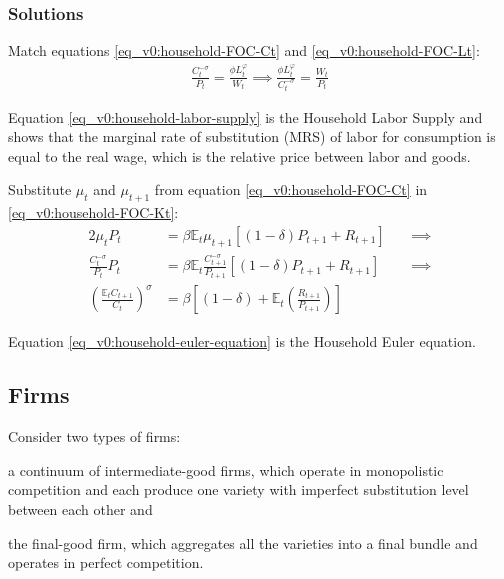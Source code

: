 \documentclass[
thesis.tex
]{subfiles}
\begin{document}
	\subsubsection*{Solutions}
	
	Match equations \ref{eq_v0:household-FOC-Ct} and \ref{eq_v0:household-FOC-Lt}:
	\begin{align}
		\label{eq_v0:household-labor-supply}
		\frac{C_t^{-\sigma}}{P_t} = \frac{\phi L_t^{\varphi}}{W_t} \implies 
		\frac{\phi L_t^{\varphi}}{C_t^{-\sigma}} = \frac{W_t}{P_t}
	\end{align}
	
	Equation \ref{eq_v0:household-labor-supply} is the Household Labor Supply and shows that the marginal rate of substitution (MRS) of labor for consumption is equal to the real wage, which is the relative price between labor and goods.
	
	Substitute $\mu_t$ and $\mu_{t+1}$ from equation \ref{eq_v0:household-FOC-Ct} in \ref{eq_v0:household-FOC-Kt}:
	\begin{alignat}{2}
		\mu_t P_t & = \beta \mathbb{E}_t \mu_{t+1} [(1-\delta) P_{t+1} + R_{t+1}] \quad &\implies \nonumber \\
		\frac{C_t^{-\sigma}}{P_t} P_t & = \beta \mathbb{E}_t \frac{C_{t+1}^{-\sigma}}{P_{t+1}} [(1-\delta) P_{t+1} + R_{t+1}] &\implies \nonumber \\
		\left( \frac{\mathbb{E}_t C_{t+1}}{C_t} \right)^\sigma & = \beta \left[ (1-\delta) + \mathbb{E}_t \left(\frac{R_{t+1}}{P_{t+1}}\right) \right] \label{eq_v0:household-euler-equation}
	\end{alignat}
	
	Equation \ref{eq_v0:household-euler-equation} is the Household Euler equation.
	
	
\subsection{Firms}
	
	Consider two types of firms: 
	\begin{enumerate*}[label=(\arabic*)]
		\item a continuum of intermediate-good firms, which operate in monopolistic competition and each produce one variety with imperfect substitution level between each other and
		
		\item the final-good firm, which aggregates all the varieties into a final bundle and operates in perfect competition.
	\end{enumerate*}
	
\end{document}
